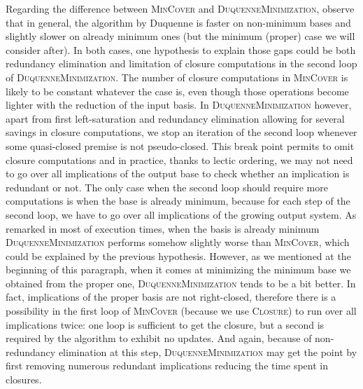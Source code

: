 Regarding the difference between \textsc{MinCover} and \textsc{DuquenneMinimization}, observe that in general, the algorithm by Duquenne is faster on non-minimum bases and slightly slower on already minimum ones (but the minimum (proper) case we will consider after). In both cases, one hypothesis to explain those gaps could be both redundancy elimination and limitation of closure computations in the second loop of \textsc{DuquenneMinimization}. The number of closure computations in \textsc{MinCover} is likely to be constant whatever the case is, even though
those operations become lighter with the reduction of the input basis. In \textsc{DuquenneMinimization} however, apart from first left-saturation and
redundancy elimination allowing for several savings in closure computations, we stop an iteration of the second loop whenever some quasi-closed premise is not
pseudo-closed. This break point permits to omit closure computations and in practice, thanks to lectic ordering, we may not need to go over all implications of the output base to check whether an implication is redundant or not. The only case when the second loop should require more computations is when the base is already minimum, because for each step of the second loop, we have to go over all implications of the growing output system. As remarked in most of execution times, when the basis is already minimum \textsc{DuquenneMinimization} performs somehow slightly worse than 
\textsc{MinCover}, which could be explained by the previous hypothesis. However,
as we mentioned at the beginning of this paragraph, when it comes at minimizing
the minimum base we obtained from the proper one, \textsc{DuquenneMinimization}
tends to be a bit better. In fact, implications of the proper basis are not
right-closed, therefore there is a possibility in the first loop of \textsc{MinCover} (because we use \textsc{Closure}) to run over all implications
twice: one loop is sufficient to get the closure, but a second is required by the algorithm to exhibit no updates. And again, because of non-redundancy elimination at this step, \textsc{DuquenneMinimization} may get the point by first removing numerous redundant implications reducing the time spent in closures.

\vspace{1.2em}



